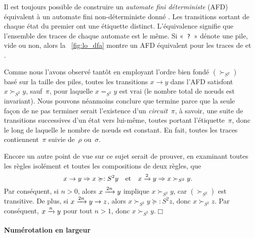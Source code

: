 Il est toujours possible de construire un \emph{automate fini
déterministe} (AFD) équivalent à un automate fini non-déterministe
donné \citep{VanLeeuwen_1990c,HopcroftMotwaniUllman_2003}. Les
transitions sortant de chaque état du premier ont une étiquette
distinct. L'équivalence signifie que l'ensemble des traces de chaque
automate est le même. Si «~\texttt{?}~» dénote une pile, vide ou non,
alors la \fig~\vref{fig:lo_dfa} montre un AFD équivalent pour les
traces de  et
.

Comme nous l'avons observé tantôt en employant l'ordre bien fondé
\((\succ_{S^2})\) basé sur la taille des piles, toutes les transitions
\(x \rightarrow y\) dans l'AFD satisfont \(x \succ_{S^2} y\),
sauf~\(\pi\), pour laquelle \(x =_{S^2} y\) est vrai (le nombre total
de nœuds est invariant). Nous pouvons néanmoins conclure que
 termine parce que la seule façon de ne pas terminer serait
l'existence d'un \emph{circuit}~\(\pi\), à savoir, une suite de
transitions successives d'un état vers lui-même, toutes portant
l'étiquette~\(\pi\), donc le long de laquelle le nombre de nœuds est
constant. En fait, toutes les traces contiennent~\(\pi\) suivie
de~\(\rho\) ou~\(\sigma\).

Encore un autre point de vue sur ce sujet serait de prouver, en
examinant toutes les règles isolément et toutes les compositions de
deux règles, que
\begin{equation*}
x \rightarrow y \Rightarrow x \succcurlyeq:{S^2} y
\quad \text{et} \quad
x \xrightarrow{\smash{2}} y \Rightarrow x \succ_{S^2} y.
\end{equation*}
Par conséquent, si \(n > 0\), alors \(x \xrightarrow{\smash{2n}} y\)
implique \(x \succ_{S^2} y\), car \((\succ_{S^2})\) est transitive. De
plus, si \(x \xrightarrow{\smash{2n}} y \rightarrow z\), alors \(x
\succ_{S^2} y \succcurlyeq:{S^2} z\), donc \(x \succ_{S^2} z\). Par
conséquent, \(x \xrightarrow{\smash{n}} y\) pour tout \(n > 1\), donc
\(x \succ_{S^2} y\).\hfill\(\Box\)

\paragraph{Numérotation en largeur}


